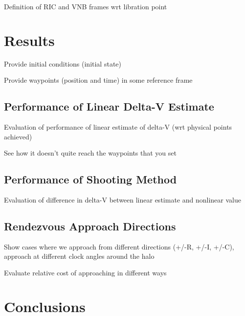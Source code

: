 \documentclass[]{article}
\begin{document}
Definition of RIC and VNB frames wrt libration point


\section{Results}

Provide initial conditions (initial state)

Provide waypoints (position and time) in some reference frame

\subsection{Performance of Linear Delta-V Estimate}
Evaluation of performance of linear estimate of delta-V (wrt physical points achieved)

See how it doesn’t quite reach the waypoints that you set

\subsection{Performance of Shooting Method}

Evaluation of difference in delta-V between linear estimate and nonlinear value

\subsection{Rendezvous Approach Directions}
Show cases where we approach from different directions (+/-R, +/-I, +/-C), approach at different clock angles around the halo

Evaluate relative cost of approaching in different ways


\section{Conclusions}

\begin{thebibliography}{99}
\end{thebibliography}
\end{document}
